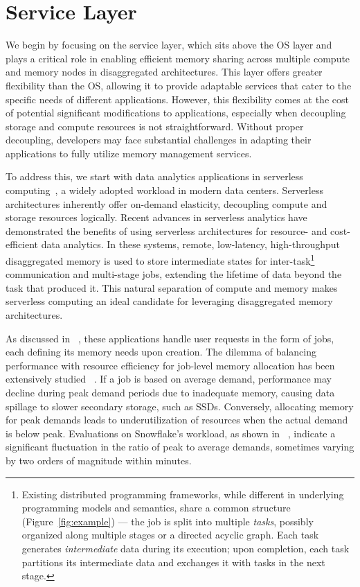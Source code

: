 \chapter{Service Layer}
\label{chap:service}

We begin by focusing on the service layer, which sits above the OS layer and plays a critical role in enabling efficient memory sharing across multiple compute and memory nodes in disaggregated architectures. This layer offers greater flexibility than the OS, allowing it to provide adaptable services that cater to the specific needs of different applications. However, this flexibility comes at the cost of potential significant modifications to applications, especially when decoupling storage and compute resources is not straightforward. Without proper decoupling, developers may face substantial challenges in adapting their applications to fully utilize memory management services.

To address this, we start with data analytics applications in serverless computing~\cite{starling, locus, pocket, flint, sparkonlambda, cirrus, excamera, pywren, numpywren, gg, athena, aurora, azuresqldw, cloudburst, snowset, caerus}, a widely adopted workload in modern data centers. Serverless architectures inherently offer on-demand elasticity, decoupling compute and storage resources logically. Recent advances in serverless analytics have demonstrated the benefits of using serverless architectures for resource- and cost-efficient data analytics. In these systems, remote, low-latency, high-throughput disaggregated memory is used to store intermediate states for inter-task{\footnote{Existing distributed programming frameworks, while different in underlying programming models and semantics, share a common structure (Figure~\ref{fig:example}) --- the job is split into multiple {\em tasks}, possibly organized along multiple stages or a directed acyclic graph. Each task generates {\em intermediate} data during its execution; upon completion, each task partitions its intermediate data and exchanges it with tasks in the next stage.}} communication and multi-stage jobs, extending the lifetime of data beyond the task that produced it. This natural separation of compute and memory makes serverless computing an ideal candidate for leveraging disaggregated memory architectures.

As discussed in ~\cite{starling, shuffling, pocket, cirrus}, these applications handle user requests in the form of jobs, each defining its memory needs upon creation. The dilemma of balancing performance with resource efficiency for job-level memory allocation has been extensively studied ~\cite{elasticquery, qoop}. If a job is based on average demand, performance may decline during peak demand periods due to inadequate memory, causing data spillage to slower secondary storage, such as SSDs. Conversely, allocating memory for peak demands leads to underutilization of resources when the actual demand is below peak. Evaluations on Snowflake's workload, as shown in ~\cite{elasticquery}, indicate a significant fluctuation in the ratio of peak to average demands, sometimes varying by two orders of magnitude within minutes.

